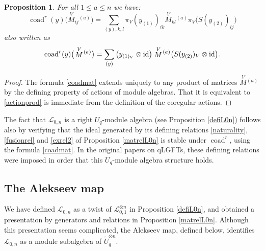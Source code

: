 \documentclass[pdftex]{sigma}%
\numberwithin{equation}{section}
\numberwithin{figure}{section}
\newtheorem{prop}[teo]{Proposition}
\newcommand{\Ll}{{\mathcal L}}
\begin{document}
\begin{prop} %
For all $1\leq a\leq n$ we have:
\begin{equation}\label{coadmat}
\operatorname{coad}^r(y)\big(\!\stackrel{V}{M}_{ij}\!{}^{(a)}\big) = \sum_{(y),k,l}\pi_V(y_{(1)})_{ik}\stackrel{V}{M}_{kl}\!{}^{(a)}\pi_V\big(S(y_{(2)})_{lj}\big)
\end{equation}
also written as
\begin{equation*}%
\operatorname{coad}^r(y)\big(\!\stackrel{V}{M}\!{}^{(a)}\big) = \sum_{(y)}\big(y_{(1)_V} \otimes {\rm id} \big)\stackrel{V}{M}\!{}^{(a)}\big( S(y_{(2)})_V \otimes {\rm id} \big).
\end{equation*}
\end{prop}
\begin{proof} The formula \eqref{coadmat} extends uniquely to any product of matrices $\stackrel{V}{M}\!{}^{(a)}$ by the defining property of actions of module algebras. That it is equivalent to \eqref{actionprod} is immediate from the definition of the coregular actions. \end{proof}
\begin{remk} The fact that $\Ll_{0,n}$ is a right $U_q$-module algebra (see Proposition \ref{defiL0n}) follows also by verifying that the ideal generated by its defining relations \eqref{naturality}, \eqref{fusionrel} and \eqref{exrel2} of Proposition \ref{matrelL0n} is stable under $\operatorname{coad}^r$, using the formula \eqref{coadmat}. In the original papers on qLGFTs, these defining relations were imposed in order that this $U_q$-module algebra structure holds.
\end{remk}

\subsection{The Alekseev map} We have defined $\Ll_{0,n}$ as a twist of $\Ll_{0,1}^{\otimes n}$ in Proposition \ref{defiL0n}, and obtained a presentation by generators and relations in Proposition \ref{matrelL0n}. Although this presentation seems complicated, the Alekseev map, defined below, identifies $\Ll_{0,n}$ as a module subalgebra of $\tilde U_q^{\otimes n}$.
\end{document}
